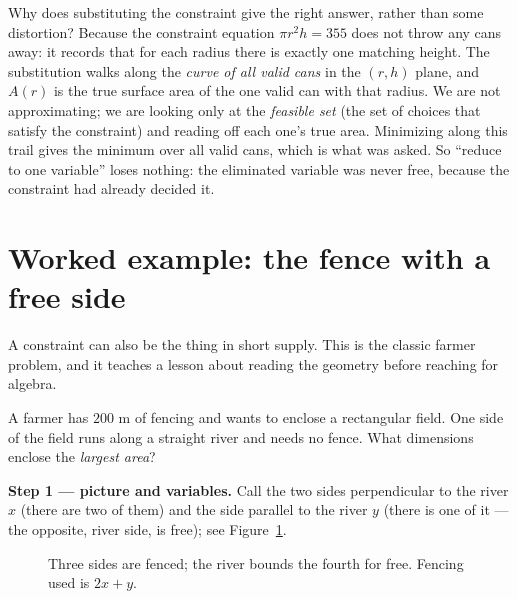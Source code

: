 \begin{whybox}
Why does substituting the constraint give the right answer, rather than some
distortion? Because the constraint equation $\pi r^2 h = 355$ does not throw any cans
away: it records that for each radius there is exactly one matching height.
The substitution walks along the \emph{curve of all valid cans} in the $(r,h)$ plane,
and $A(r)$ is the true surface area of the one valid can with that radius. We are
not approximating; we are looking only at the \emph{feasible set} (the set of choices
that satisfy the constraint) and reading off each one's true area. Minimizing along
this trail gives the minimum over all valid cans, which is what was asked. So
``reduce to one variable'' loses nothing: the eliminated variable was never free,
because the constraint had already decided it.
\end{whybox}

\section{Worked example: the fence with a free side}

A constraint can also be the thing in short supply. This is the classic farmer
problem, and it teaches a lesson about reading the geometry before reaching for
algebra.

\begin{example}\label{ch17:ex-fence}
A farmer has $200$ m of fencing and wants to enclose a rectangular field. One side of
the field runs along a straight river and needs no fence. What dimensions enclose the
\emph{largest area}?
\end{example}

\textbf{Step 1 --- picture and variables.} Call the two sides perpendicular to the
river $x$ (there are two of them) and the side parallel to the river $y$ (there is
one of it --- the opposite, river side, is free); see Figure~\ref{ch17:fig-fence}.

\begin{figure}[H]
\centering
{}
\caption{Three sides are fenced; the river bounds the fourth for free. Fencing used
is $2x+y$.}
\label{ch17:fig-fence}
\end{figure}

